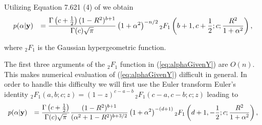 




%
%

\noindent 
Utilizing  Equation 7.621 (4) of \cite{Gradshteyn2007} we obtain
\begin{equation}\label{eq:alphaGivenY}
\begin{array}{rl}
\displaystyle p(\alpha|{\bf y}) 
& \displaystyle = \frac{ \Gamma\left( c + \tfrac{1}{2} \right) (1 -  R^2)^{b+1}  }{ \Gamma(c)\sqrt{\pi}} 
\left( 1+\alpha^2 \right)^{-n/2} {}_2F_1\left( b+1, c + \frac{1}{2}; c; \frac{R^2}{1+\alpha^2}  \right),
\end{array}
\end{equation}

\noindent where ${}_2F_1$ is the Gaussian hypergeometric function.

The first three arguments of the ${}_2F_1$ function in (\ref{eq:alphaGivenY}) are $O(n)$. This makes 
numerical evaluation of (\ref{eq:alphaGivenY}) difficult in general. In order to handle this difficulty
we will first use the Euler transform
Euler's identity 
${}_{2}F_{1}(a,b;c;z)=(1-z)^{c-a-b}\,{}_{2}F_{1}(c-a,c-b;c;z)$ leading to
\begin{equation}\label{eq:alphaGivenY_2}
	\begin{array}{rl}
		\displaystyle p(\alpha|{\bf y}) 
		& \displaystyle = \frac{ \Gamma\left( c + \tfrac{1}{2} \right)   }{ \Gamma(c)\sqrt{\pi}} 
		\frac{(1 -  R^2)^{b+1}}{(  \alpha^2 + 1 - R^2 )^{b+3/2}}
		\left( 1+\alpha^2 \right)^{ - (d+1) }   
		
		 {}_2F_1\left( d + 1,  - \frac{1}{2}; c; \frac{R^2}{1+\alpha^2}  \right),
	\end{array}
\end{equation}

